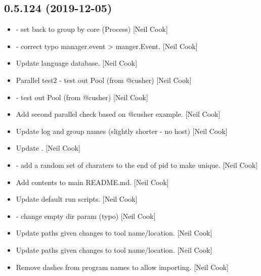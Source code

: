 \documentclass[a4paper,10pt,english]{report}
\begin{document}
\subsection{0.5.124 (2019-12-05)}
\label{\detokenize{misc/changelog:id19}}\begin{itemize}
\item {} 
 - set  back to group
by core (Process) {[}Neil Cook{]}

\item {} 
 - correct typo manager.event \textendash{}\textgreater{}
manger.Event. {[}Neil Cook{]}

\item {} 
Update language database. {[}Neil Cook{]}

\item {} 
Parallel test2 - test out Pool (from @cusher) {[}Neil Cook{]}

\item {} 
 - test out Pool (from @cusher)
{[}Neil Cook{]}

\item {} 
Add second parallel check based on @cusher example. {[}Neil Cook{]}

\item {} 
Update log and group names (slightly shorter - no host) {[}Neil Cook{]}

\item {} 
Update . {[}Neil Cook{]}

\item {} 
 - add a random set of charaters to the end of
pid to make unique. {[}Neil Cook{]}

\item {} 
Add contents to main README.md. {[}Neil Cook{]}

\item {} 
Update default run scripts. {[}Neil Cook{]}

\item {} 
 - change empty dir param (typo) {[}Neil
Cook{]}

\item {} 
Update paths given changes to tool name/location. {[}Neil Cook{]}

\item {} 
Update paths given changes to tool name/location. {[}Neil Cook{]}

\item {} 
Remove dashes from program names to allow importing. {[}Neil Cook{]}

\end{itemize}
\end{document}
